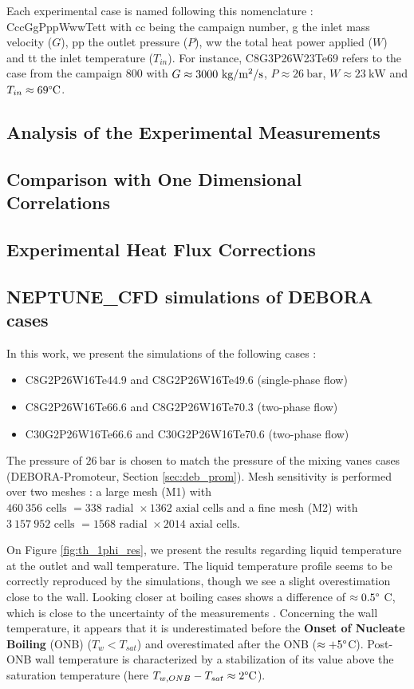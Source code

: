 Each experimental case is named following this nomenclature : CccGgPppWwwTett with cc being the campaign number, g the inlet mass velocity ($G$), pp the outlet pressure ($P$), ww the total heat power applied ($W$) and tt the inlet temperature ($T_{in}$).
For instance, C8G3P26W23Te69 refers to the case from the campaign 800 with $G\approx 3000~\text{kg/m$^{2}$/s}$, $P\approx 26~\text{bar}$, $W\approx 23~\text{kW}$ and $T_{in}\approx 69\degree\text{C}$.

\subsection{Analysis of the Experimental Measurements}

\subsection{Comparison with One Dimensional Correlations}

\subsection{Experimental Heat Flux Corrections}

\subsection{NEPTUNE\_CFD simulations of DEBORA cases}

In this work, we present the simulations of the following cases :
\begin{itemize}
\item C8G2P26W16Te44.9 and C8G2P26W16Te49.6 (single-phase flow)
\item C8G2P26W16Te66.6 and C8G2P26W16Te70.3 (two-phase flow)
\item C30G2P26W16Te66.6 and C30G2P26W16Te70.6 (two-phase flow)
\end{itemize}

The pressure of $26~\text{bar}$ is chosen to match the pressure of the mixing vanes cases (DEBORA-Promoteur, Section \ref{sec:deb_prom}). Mesh sensitivity is performed over two meshes : a large mesh (M1) with $460~356\text{ cells }=338\text{ radial } \times 1362 \text{ axial cells}$ and a fine mesh (M2) with $3~157~952\text{ cells }=1568\text{ radial } \times 2014 \text{ axial cells}$.

On Figure \ref{fig:th_1phi_res}, we present the results regarding liquid temperature at the outlet and wall temperature. The liquid temperature profile seems to be correctly reproduced by the simulations, though we see a slight overestimation close to the wall. Looking closer at boiling cases shows a difference of $\approx 0.5\degree$ C, which is close to the uncertainty of the measurements \cite{Garnier2001}. Concerning the wall temperature, it appears that it is underestimated before the \textbf{Onset of Nucleate Boiling} (ONB) ($T_{w}<T_{sat}$) and overestimated after the ONB ($\approx +5\degree$C). Post-ONB wall temperature is characterized by a stabilization of its value above the saturation temperature (here $T_{w,ONB}-T_{sat}\approx 2\degree\text{C}$).

